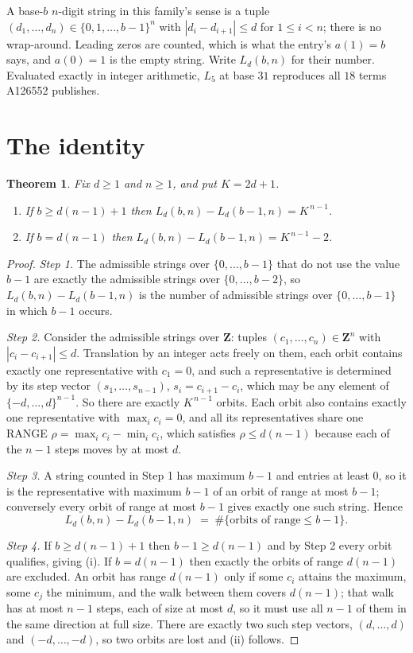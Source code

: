 \documentclass[11pt,a4paper]{article}
\theoremstyle{plain}
\newtheorem{theorem}{Theorem}
\theoremstyle{definition}
\begin{document}
A base-$b$ $n$-digit string in this family's sense is a tuple
$(d_1,\dots,d_n)\in\{0,1,\dots,b-1\}^{n}$ with $|d_i-d_{i+1}|\le d$ for $1\le i<n$; there
is no wrap-around. Leading zeros are counted, which is what the entry's $a(1)=b$ says, and
$a(0)=1$ is the empty string. Write $L_d(b,n)$ for their number. Evaluated exactly in integer
arithmetic, $L_{5}$ at base $31$ reproduces all $18$ terms A126552 publishes.

\section{The identity}

\begin{theorem}
Fix $d\ge1$ and $n\ge1$, and put $K=2d+1$.
\begin{enumerate}
\item[(i)] If $b\ge d(n-1)+1$ then $L_d(b,n)-L_d(b-1,n)=K^{\,n-1}$.
\item[(ii)] If $b=d(n-1)$ then $L_d(b,n)-L_d(b-1,n)=K^{\,n-1}-2$.
\end{enumerate}
\end{theorem}

\begin{proof}
\emph{Step 1.} The admissible strings over $\{0,\dots,b-1\}$ that do not use the value $b-1$
are exactly the admissible strings over $\{0,\dots,b-2\}$, so $L_d(b,n)-L_d(b-1,n)$ is the
number of admissible strings over $\{0,\dots,b-1\}$ in which $b-1$ occurs.

\emph{Step 2.} Consider the admissible strings over $\mathbf{Z}$: tuples
$(c_1,\dots,c_n)\in\mathbf{Z}^{n}$ with $|c_i-c_{i+1}|\le d$. Translation by an integer acts
freely on them, each orbit contains exactly one representative with $c_1=0$, and such a
representative is determined by its step vector $(s_1,\dots,s_{n-1})$, $s_i=c_{i+1}-c_i$,
which may be any element of $\{-d,\dots,d\}^{n-1}$. So there are exactly $K^{\,n-1}$ orbits.
Each orbit also contains exactly one representative with $\max_i c_i=0$, and all its
representatives share one RANGE $\rho=\max_ic_i-\min_ic_i$, which satisfies
$\rho\le d(n-1)$ because each of the $n-1$ steps moves by at most $d$.

\emph{Step 3.} A string counted in Step 1 has maximum $b-1$ and entries at least $0$, so it is
the representative with maximum $b-1$ of an orbit of range at most $b-1$; conversely every orbit
of range at most $b-1$ gives exactly one such string. Hence
\[
L_d(b,n)-L_d(b-1,n)\;=\;\#\{\text{orbits of range}\le b-1\} .
\]

\emph{Step 4.} If $b\ge d(n-1)+1$ then $b-1\ge d(n-1)$ and by Step 2 every orbit qualifies,
giving (i). If $b=d(n-1)$ then exactly the orbits of range $d(n-1)$ are excluded. An orbit has
range $d(n-1)$ only if some $c_i$ attains the maximum, some $c_j$ the minimum, and the walk
between them covers $d(n-1)$; that walk has at most $n-1$ steps, each of size at most $d$, so it
must use all $n-1$ of them in the same direction at full size. There are exactly two such step
vectors, $(d,\dots,d)$ and $(-d,\dots,-d)$, so two orbits are lost and (ii) follows.
\end{proof}
\end{document}
